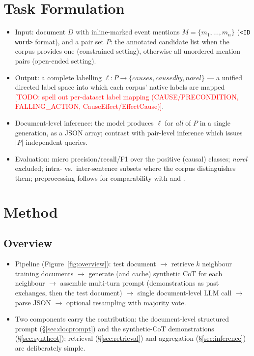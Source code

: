 \documentclass[11pt]{article}
\newcommand{\todo}[1]{\textcolor{red}{[TODO: #1]}}
\begin{document}
\section{Task Formulation}
\label{sec:task}

\begin{itemize}
  \item Input: document $D$ with inline-marked event mentions
        $M = \{m_1, \dots, m_n\}$ (\texttt{<ID word>} format), and a pair set
        $P$: the annotated candidate list when the corpus provides one
        (constrained setting), otherwise all unordered mention pairs
        (open-ended setting).
  \item Output: a complete labelling $\ell : P \to \{\textit{causes},
        \textit{causedby}, \textit{norel}\}$ --- a unified directed label space
        into which each corpus' native labels are mapped
        \todo{spell out per-dataset label mapping (CAUSE/PRECONDITION,
        FALLING\_ACTION, CauseEffect/EffectCause)}.
  \item Document-level inference: the model produces $\ell$ for \emph{all} of
        $P$ in a single generation, as a JSON array; contrast with pair-level
        inference which issues $|P|$ independent queries.
  \item Evaluation: micro precision/recall/F1 over the positive (causal)
        classes; \textit{norel} excluded; intra- vs.\ inter-sentence subsets
        where the corpus distinguishes them; preprocessing follows
        \citet{gao2023chatgpt} for comparability with \citet{hao2026sere} and
        \citet{cai2025dreci}.
\end{itemize}

\section{Method}
\label{sec:method}

\subsection{Overview}
\begin{itemize}
  \item Pipeline (Figure~\ref{fig:overview}): test document $\to$ retrieve $k$
        neighbour training documents $\to$ generate (and cache) synthetic CoT
        for each neighbour $\to$ assemble multi-turn prompt (demonstrations as
        past exchanges, then the test document) $\to$ single document-level LLM
        call $\to$ parse JSON $\to$ optional resampling with majority vote.
  \item Two components carry the contribution: the document-level structured
        prompt (\S\ref{sec:docprompt}) and the synthetic-CoT demonstrations
        (\S\ref{sec:synthcot}); retrieval (\S\ref{sec:retrieval}) and
        aggregation (\S\ref{sec:inference}) are deliberately simple.
\end{itemize}
\end{document}
